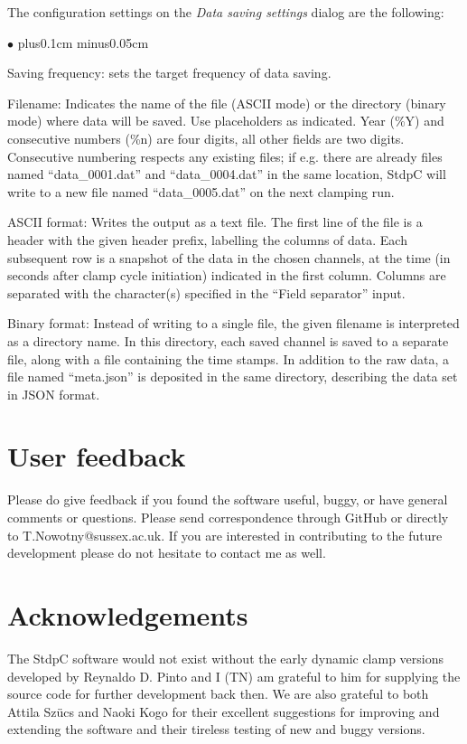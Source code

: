 \documentclass{article}
\newenvironment{myitem}{\begin{list}{$\bullet$}{\setlength{\leftmargin}{1.1em}
\itemsep0.1cm plus0.1cm minus0.05cm
\listparindent0cm
\addtolength{\labelsep}{0.5\labelsep}
\setlength{\labelwidth}{0.8em}
\setlength{\leftmargin}{\labelwidth}
\addtolength{\leftmargin}{\labelsep}
}}{\end{list}}
\begin{document}
\noindent
The configuration settings on the \emph{Data saving settings} dialog are
the following:
\begin{myitem}
\item Saving frequency: sets the target frequency of data saving.
\item Filename: Indicates the name of the file (ASCII mode) or the directory (binary mode) where data
will be saved. Use placeholders as indicated. Year (\%Y) and consecutive numbers (\%n) are four digits,
all other fields are two digits. Consecutive numbering respects any existing files; if e.g. there are
already files named ``data\_0001.dat'' and ``data\_0004.dat'' in the same location, StdpC will write to
a new file named ``data\_0005.dat'' on the next clamping run.
\item ASCII format: Writes the output as a text file. The first line of the file is a header with the
given header prefix, labelling the columns of data. Each subsequent row is a snapshot of the data in
the chosen channels, at the time (in seconds after clamp cycle initiation) indicated in the first column.
Columns are separated with the character(s) specified in the ``Field separator'' input.
\item Binary format: Instead of writing to a single file, the given filename is interpreted as a directory
name. In this directory, each saved channel is saved to a separate file, along with a file containing
the time stamps. In addition to the raw data, a file named ``meta.json'' is deposited in the same
directory, describing the data set in JSON format.
\end{myitem}


\section{User feedback} 
Please do give feedback if you found the software useful, buggy, or
have general comments or questions. Please send correspondence through
GitHub or directly to T.Nowotny@sussex.ac.uk.
If you are interested in contributing to the future development please
do not hesitate to contact me as well.  
 
\section{Acknowledgements} 
 
The StdpC software would not exist without the early dynamic clamp
versions developed by Reynaldo D. Pinto and I (TN) am grateful to him for supplying the source code for further
development back then. We are also grateful to both Attila Sz\"ucs and Naoki Kogo for their excellent
suggestions for improving and extending the software and their tireless
testing of new and buggy versions.



\end{document}

